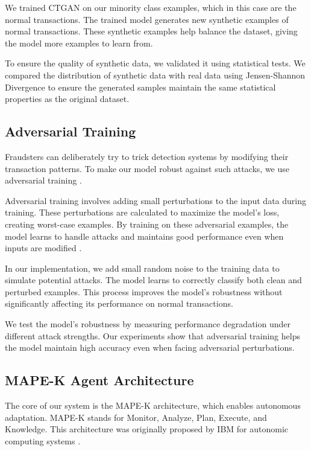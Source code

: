 We trained CTGAN on our minority class examples, which in this case are the normal transactions. The trained model generates new synthetic examples of normal transactions. These synthetic examples help balance the dataset, giving the model more examples to learn from.

To ensure the quality of synthetic data, we validated it using statistical tests. We compared the distribution of synthetic data with real data using Jensen-Shannon Divergence to ensure the generated samples maintain the same statistical properties as the original dataset.

\subsection{Adversarial Training}

Fraudsters can deliberately try to trick detection systems by modifying their transaction patterns. To make our model robust against such attacks, we use adversarial training \cite{madry2018adversarial}.

Adversarial training involves adding small perturbations to the input data during training. These perturbations are calculated to maximize the model's loss, creating worst-case examples. By training on these adversarial examples, the model learns to handle attacks and maintains good performance even when inputs are modified \cite{goodfellow2014gan}.

In our implementation, we add small random noise to the training data to simulate potential attacks. The model learns to correctly classify both clean and perturbed examples. This process improves the model's robustness without significantly affecting its performance on normal transactions.

We test the model's robustness by measuring performance degradation under different attack strengths. Our experiments show that adversarial training helps the model maintain high accuracy even when facing adversarial perturbations.

\subsection{MAPE-K Agent Architecture}

The core of our system is the MAPE-K architecture, which enables autonomous adaptation. MAPE-K stands for Monitor, Analyze, Plan, Execute, and Knowledge. This architecture was originally proposed by IBM for autonomic computing systems \cite{ibm2005autonomic, kephart2003vision}.

